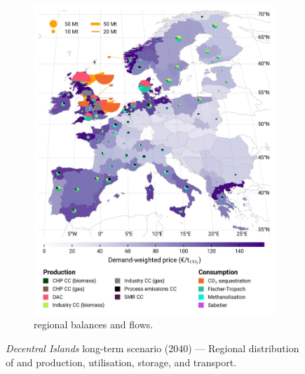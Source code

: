 \documentclass[preprint,12pt,sort&compress]{elsarticle}
\begin{document}
\begin{figure}[htbp]
\begin{subfigure}[t]{0.49\textwidth}
      \includegraphics[width=1\textwidth]{maps/no-pipelines-no-pcipmi/base_s_adm___2040-balance_map_co2_stored} 
      \vspace{-0.7cm}
      \caption{ regional balances and flows.}
      \label{fig:DI_lt_2040_co2}
  \end{subfigure}
  \caption{\textit{Decentral Islands} long-term scenario (2040) --- Regional distribution of  and  production, utilisation, storage, and transport.}
  \label{fig:DI_lt_2040}
\end{figure}
\end{document}
